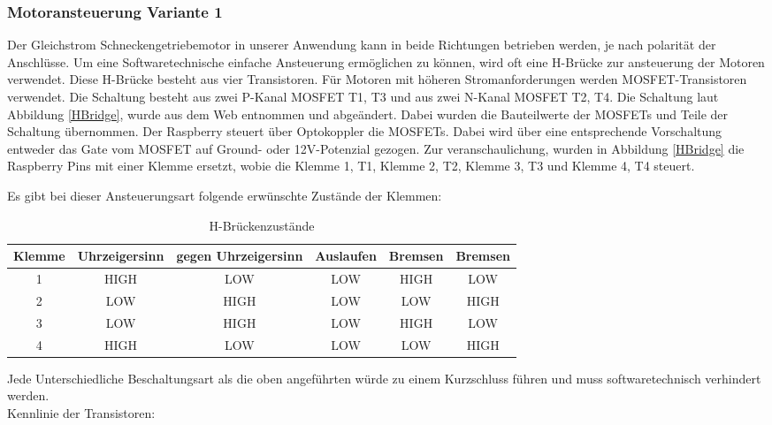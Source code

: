 \subsubsection{Motoransteuerung Variante 1}
Der Gleichstrom Schneckengetriebemotor in unserer Anwendung kann in beide Richtungen betrieben werden, je nach polarität der Anschlüsse. Um eine Softwaretechnische einfache Ansteuerung ermöglichen zu können, wird oft eine H-Brücke zur ansteuerung der Motoren verwendet. Diese H-Brücke besteht aus vier Transistoren. Für Motoren mit höheren Stromanforderungen werden MOSFET-Transistoren verwendet. Die Schaltung besteht aus zwei P-Kanal MOSFET T1, T3 und aus zwei N-Kanal MOSFET T2, T4. Die Schaltung laut Abbildung \ref{HBridge}, wurde aus dem Web entnommen und abgeändert. Dabei wurden die Bauteilwerte der MOSFETs und Teile der Schaltung übernommen. Der Raspberry steuert über Optokoppler die MOSFETs. Dabei wird über eine entsprechende Vorschaltung entweder das Gate vom MOSFET auf Ground- oder 12V-Potenzial gezogen. Zur veranschaulichung, wurden in Abbildung \ref{HBridge} die Raspberry Pins mit einer Klemme ersetzt, wobie die Klemme 1, T1, Klemme 2, T2, Klemme 3, T3 und Klemme 4, T4 steuert. 

Es gibt bei dieser Ansteuerungsart folgende erwünschte Zustände der Klemmen: \\
\begin{table}[htb]
\centering
\begin{tabular}{|c|c|c|c|c|c|} \hline
Klemme & Uhrzeigersinn & gegen Uhrzeigersinn & Auslaufen & Bremsen & Bremsen \\ \hline
1 & HIGH & LOW & LOW & HIGH & LOW  \\ \hline
2 & LOW & HIGH & LOW & LOW & HIGH \\ \hline
3 & LOW & HIGH & LOW & HIGH & LOW \\ \hline
4 & HIGH & LOW & LOW & LOW & HIGH \\ \hline
\end{tabular}
\caption{H-Brückenzustände}
\label{HBridge states}
\end{table}

Jede Unterschiedliche Beschaltungsart als die oben angeführten würde zu einem Kurzschluss führen und muss softwaretechnisch verhindert werden. \\


Kennlinie der Transistoren:

